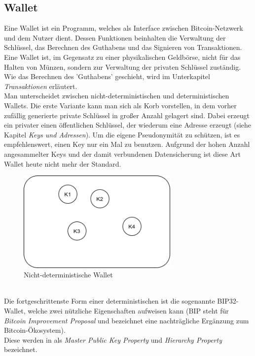 \subsection{Wallet}
Eine Wallet ist ein Programm, welches als Interface zwischen Bitcoin-Netzwerk und dem Nutzer dient. 
Dessen Funktionen beinhalten die Verwaltung der Schlüssel, das Berechnen des Guthabens und das Signieren von Transaktionen.
Eine Wallet ist, im Gegensatz zu einer physikalischen Geldbörse, nicht für das Halten von Münzen, sondern zur Verwaltung der privaten Schlüssel zuständig. 
Wie das Berechnen des 'Guthabens' geschieht, wird im Unterkapitel \emph{Transaktionen} erläutert.\\
Man unterscheidet zwischen nicht-deterministischen und deterministischen Wallets. Die erste Variante kann man sich als Korb vorstellen, in dem vorher zufällig generierte private Schlüssel in großer Anzahl gelagert sind. Dabei erzeugt ein privater einen öffentlichen Schlüssel, der wiederum eine Adresse erzeugt (siehe Kapitel \emph{Keys und Adressen}).
Um die eigene Pseudonymität zu schützen, ist es empfehlenswert, einen Key nur ein Mal zu benutzen. Aufgrund der hohen Anzahl angesammelter Keys und der damit verbundenen Datensicherung ist diese Art Wallet heute nicht mehr der Standard.
\begin{figure}[htpb]
	\centering
	\includegraphics[width=0.7\textwidth]{images/non_det_wallet.png}
	\caption{Nicht-deterministische Wallet}
	\label{6braun:fig:non-deterministic_wallet}
\end{figure}\\
Die fortgeschrittenste Form einer deterministischen ist die sogenannte BIP32-Wallet, welche zwei nützliche Eigenschaften aufweisen kann (BIP steht für \emph{Bitcoin Improvement Proposal} und bezeichnet eine nachträgliche Ergänzung zum Bitcoin-Ökosystem).\\
Diese werden in \cite{buterin_2013} als \emph{Master Public Key Property} und \emph{Hierarchy Property} bezeichnet.
